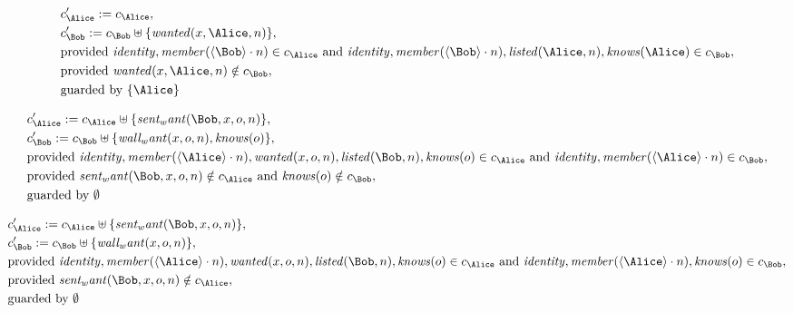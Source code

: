 \begin{align*}
&
c'_
{
\Alice
}
 := 
c_
{
\Alice
}
,\\
&
c'_
{
\Bob
}
 := 
c_
{
\Bob
}
 \uplus 
\{
\mathit{
wanted
}
(
x
,
\Alice
,
n
)
\}
,\\
&
\text{provided } 
\mathit{
identity
}
,
\mathit{
member
}
(
\langle
\Bob
\rangle
\cdot
n
)
 \in c_
{
\Alice
}
 \text{ and } 
\mathit{
identity
}
,
\mathit{
member
}
(
\langle
\Bob
\rangle
\cdot
n
)
,
\mathit{
listed
}
(
\Alice
,
n
)
,
\mathit{
knows
}
(
\Alice
)
 \in c_
{
\Bob
}
,\\
&
\text{provided } 
\mathit{
wanted
}
(
x
,
\Alice
,
n
)
 \notin c_
{
\Bob
}
,\\
&
\text{guarded by } \{
\Alice
\}
\end{align*}

\begin{align*}
&
c'_
{
\Alice
}
 := 
c_
{
\Alice
}
 \uplus 
\{
\mathit{
sent_want
}
(
\Bob
,
x
,
o
,
n
)
\}
,\\
&
c'_
{
\Bob
}
 := 
c_
{
\Bob
}
 \uplus 
\{
\mathit{
wall_want
}
(
x
,
o
,
n
)
,
\mathit{
knows
}
(
o
)
\}
,\\
&
\text{provided } 
\mathit{
identity
}
,
\mathit{
member
}
(
\langle
\Alice
\rangle
\cdot
n
)
,
\mathit{
wanted
}
(
x
,
o
,
n
)
,
\mathit{
listed
}
(
\Bob
,
n
)
,
\mathit{
knows
}
(
o
)
 \in c_
{
\Alice
}
 \text{ and } 
\mathit{
identity
}
,
\mathit{
member
}
(
\langle
\Alice
\rangle
\cdot
n
)
 \in c_
{
\Bob
}
,\\
&
\text{provided } 
\mathit{
sent_want
}
(
\Bob
,
x
,
o
,
n
)
 \notin c_
{
\Alice
}
 \text{ and } 
\mathit{
knows
}
(
o
)
 \notin c_
{
\Bob
}
,\\
&
\text{guarded by } \emptyset
\end{align*}

\begin{align*}
&
c'_
{
\Alice
}
 := 
c_
{
\Alice
}
 \uplus 
\{
\mathit{
sent_want
}
(
\Bob
,
x
,
o
,
n
)
\}
,\\
&
c'_
{
\Bob
}
 := 
c_
{
\Bob
}
 \uplus 
\{
\mathit{
wall_want
}
(
x
,
o
,
n
)
\}
,\\
&
\text{provided } 
\mathit{
identity
}
,
\mathit{
member
}
(
\langle
\Alice
\rangle
\cdot
n
)
,
\mathit{
wanted
}
(
x
,
o
,
n
)
,
\mathit{
listed
}
(
\Bob
,
n
)
,
\mathit{
knows
}
(
o
)
 \in c_
{
\Alice
}
 \text{ and } 
\mathit{
identity
}
,
\mathit{
member
}
(
\langle
\Alice
\rangle
\cdot
n
)
,
\mathit{
knows
}
(
o
)
 \in c_
{
\Bob
}
,\\
&
\text{provided } 
\mathit{
sent_want
}
(
\Bob
,
x
,
o
,
n
)
 \notin c_
{
\Alice
}
,\\
&
\text{guarded by } \emptyset
\end{align*}
